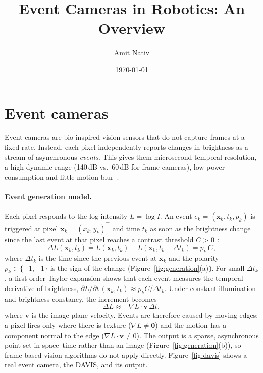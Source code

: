 \documentclass{article}
\title{Event Cameras in Robotics: An Overview}
\author{Amit Nativ}
\date{\today}
\begin{document}
\maketitle

\section{Event cameras}

Event cameras are bio-inspired vision sensors that do not capture frames at a fixed rate.
Instead, each pixel independently reports changes in brightness as a stream of asynchronous
\emph{events}. This gives them microsecond temporal resolution, a high dynamic range
(140\,dB vs.\ 60\,dB for frame cameras), low power consumption and little motion
blur~\cite{gallegoEventbasedVisionSurvey2022,chakravarthiRecentEventCamera2024}.

\paragraph{Event generation model.}
Each pixel responds to the log intensity $L=\log I$. An event $e_k=(\mathbf{x}_k,t_k,p_k)$ is
triggered at pixel $\mathbf{x}_k=(x_k,y_k)^\top$ and time $t_k$ as soon as the brightness
change since the last event at that pixel reaches a contrast threshold
$C>0$~\cite{gallegoEventbasedVisionSurvey2022}:
\begin{equation}
    \Delta L(\mathbf{x}_k,t_k) \doteq L(\mathbf{x}_k,t_k) - L(\mathbf{x}_k,t_k-\Delta t_k) = p_k\,C ,
    \label{eq:event_generation}
\end{equation}
where $\Delta t_k$ is the time since the previous event at $\mathbf{x}_k$ and the polarity
$p_k\in\{+1,-1\}$ is the sign of the change (Figure~\ref{fig:generation}(a)). For small
$\Delta t_k$, a first-order Taylor expansion shows that each event measures the temporal
derivative of brightness, $\partial L/\partial t\,(\mathbf{x}_k,t_k)\approx p_kC/\Delta t_k$.
Under constant illumination and brightness constancy, the increment becomes
\begin{equation}
    \Delta L \approx -\nabla L\cdot\mathbf{v}\,\Delta t ,
    \label{eq:moving_edges}
\end{equation}
where $\mathbf{v}$ is the image-plane velocity. Events are therefore caused by moving edges: a
pixel fires only where there is texture ($\nabla L\neq\mathbf{0}$) and the motion has a
component normal to the edge ($\nabla L\cdot\mathbf{v}\neq 0$). The output is a sparse,
asynchronous point set in space--time rather than an image
(Figure~\ref{fig:generation}(b)), so frame-based vision algorithms do not apply directly.
Figure~\ref{fig:davis} shows a real event camera, the DAVIS, and its output.
\end{document}
